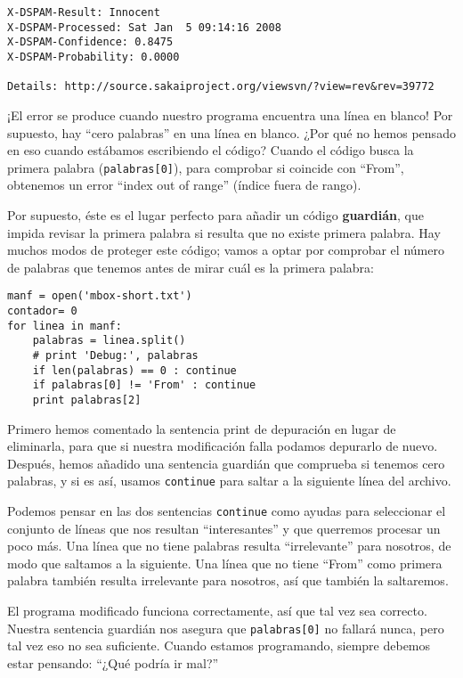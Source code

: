 \begin{enumerate}
\beforeverb
\begin{verbatim}
X-DSPAM-Result: Innocent
X-DSPAM-Processed: Sat Jan  5 09:14:16 2008
X-DSPAM-Confidence: 0.8475
X-DSPAM-Probability: 0.0000

Details: http://source.sakaiproject.org/viewsvn/?view=rev&rev=39772
\end{verbatim}
\afterverb
%
¡El error se produce cuando nuestro programa encuentra una línea en blanco! Por supuesto,
hay ``cero palabras'' en una línea en blanco. ¿Por qué no hemos pensado en eso
cuando estábamos escribiendo el código? Cuando el código busca la primera
palabra (\verb"palabras[0]"), para comprobar si coincide con ``From'',
obtenemos un error ``index out of range'' (índice fuera de rango).

Por supuesto, éste es el lugar perfecto para añadir un código {\bf guardián},
que impida revisar la primera palabra si resulta que no existe primera palabra.
Hay muchos modos de proteger este código; vamos a optar por
comprobar el número de palabras que tenemos antes de mirar cuál es la primera palabra:

\beforeverb
\begin{verbatim}
manf = open('mbox-short.txt')
contador= 0
for linea in manf:
    palabras = linea.split()
    # print 'Debug:', palabras
    if len(palabras) == 0 : continue
    if palabras[0] != 'From' : continue
    print palabras[2]
\end{verbatim}
\afterverb
%
Primero hemos comentado la sentencia print de depuración en lugar de eliminarla,
para que si nuestra modificación falla podamos depurarlo de nuevo. Después, hemos añadido
una sentencia guardián que comprueba si tenemos cero palabras, y si es así,
usamos {\tt continue} para saltar a la siguiente línea del archivo. 

Podemos pensar en las dos sentencias {\tt continue} como ayudas para seleccionar
el conjunto de líneas que nos resultan ``interesantes'' y que querremos
procesar un poco más. Una línea que no tiene palabras resulta ``irrelevante'' para
nosotros, de modo que saltamos a la siguiente. Una línea que no tiene ``From''
como primera palabra también resulta irrelevante para nosotros, así que también la saltaremos.

El programa modificado funciona correctamente, así que tal vez sea correcto. Nuestra
sentencia guardián nos asegura que {\tt palabras[0]} no fallará nunca,
pero tal vez eso no sea suficiente. Cuando estamos programando, siempre debemos
estar pensando: ``¿Qué podría ir mal?''


\end{enumerate}
